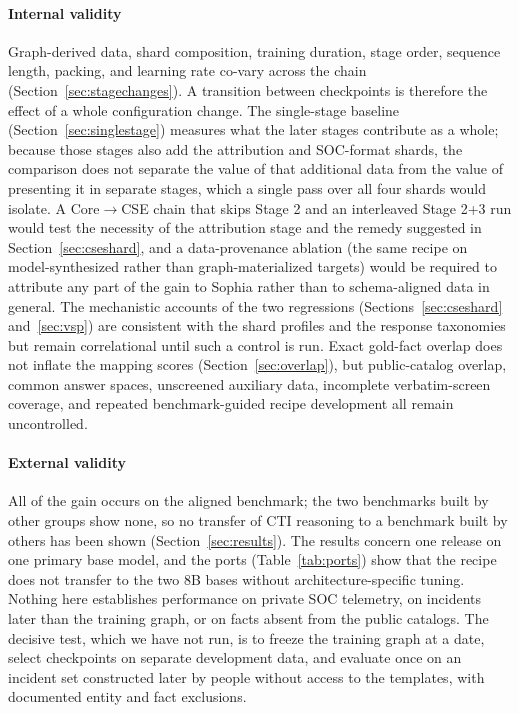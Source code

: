 \documentclass[a4paper,fleqn]{cas-dc}
\begin{document}
\paragraph{Internal validity}
Graph-derived data, shard composition, training duration, stage order, sequence length, packing, and learning rate co-vary across the chain (Section~\ref{sec:stagechanges}). A transition between checkpoints is therefore the effect of a whole configuration change. The single-stage baseline (Section~\ref{sec:singlestage}) measures what the later stages contribute as a whole; because those stages also add the attribution and SOC-format shards, the comparison does not separate the value of that additional data from the value of presenting it in separate stages, which a single pass over all four shards would isolate. A Core$\rightarrow$CSE chain that skips Stage 2 and an interleaved Stage 2+3 run would test the necessity of the attribution stage and the remedy suggested in Section~\ref{sec:cseshard}, and a data-provenance ablation (the same recipe on model-synthesized rather than graph-materialized targets) would be required to attribute any part of the gain to Sophia rather than to schema-aligned data in general. The mechanistic accounts of the two regressions (Sections~\ref{sec:cseshard} and~\ref{sec:vsp}) are consistent with the shard profiles and the response taxonomies but remain correlational until such a control is run. Exact gold-fact overlap does not inflate the mapping scores (Section~\ref{sec:overlap}), but public-catalog overlap, common answer spaces, unscreened auxiliary data, incomplete verbatim-screen coverage, and repeated benchmark-guided recipe development all remain uncontrolled.

\paragraph{External validity}
All of the gain occurs on the aligned benchmark; the two benchmarks built by other groups show none, so no transfer of CTI reasoning to a benchmark built by others has been shown (Section~\ref{sec:results}). The results concern one release on one primary base model, and the ports (Table~\ref{tab:ports}) show that the recipe does not transfer to the two 8B bases without architecture-specific tuning. Nothing here establishes performance on private SOC telemetry, on incidents later than the training graph, or on facts absent from the public catalogs. The decisive test, which we have not run, is to freeze the training graph at a date, select checkpoints on separate development data, and evaluate once on an incident set constructed later by people without access to the templates, with documented entity and fact exclusions.
\end{document}
